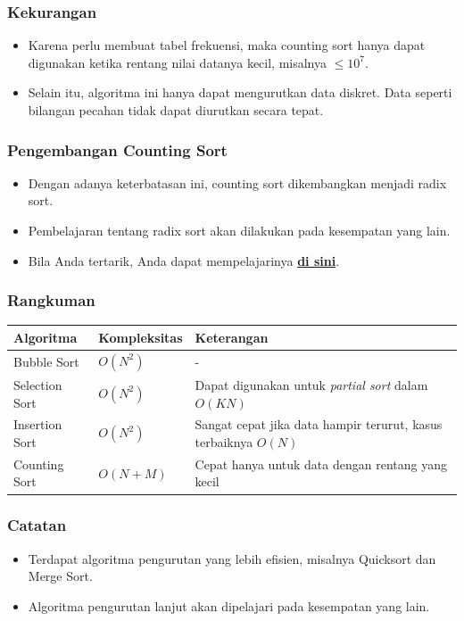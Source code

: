 \begin{frame}
\frametitle{Kekurangan}
  \begin{itemize}
    \item Karena perlu membuat tabel frekuensi, maka counting sort hanya dapat digunakan ketika rentang nilai datanya kecil, misalnya $\le 10^7$.
    \item Selain itu, algoritma ini hanya dapat mengurutkan data diskret. Data seperti bilangan pecahan tidak dapat diurutkan secara tepat.
  \end{itemize}
\end{frame}

\begin{frame}
\frametitle{Pengembangan Counting Sort}
  \begin{itemize}
    \item Dengan adanya keterbatasan ini, counting sort dikembangkan
    menjadi radix sort.
    \item Pembelajaran tentang radix sort akan dilakukan pada
    kesempatan yang lain.
    \item Bila Anda tertarik, Anda dapat mempelajarinya \href{https://en.wikipedia.org/wiki/Radix_sort}{\textbf{di sini}}.
  \end{itemize}
\end{frame}

\begin{frame}
\frametitle{Rangkuman}
  \begin{table}[ht]
    \begin{tabular}{|l|l|p{5 cm}|}
      \hline Algoritma  & Kompleksitas & Keterangan \\
      \hline Bubble Sort & $O(N^2)$ & - \\
      \hline Selection Sort & $O(N^2)$ & Dapat digunakan untuk \textit{partial sort} dalam $O(KN)$ \\
      \hline Insertion Sort & $O(N^2)$ & Sangat cepat jika data hampir terurut, kasus terbaiknya $O(N)$ \\
      \hline Counting Sort & $O(N+M)$ & Cepat hanya untuk data dengan rentang yang kecil \\
      \hline
    \end{tabular}
  \end{table}
\end{frame}

\begin{frame}
\frametitle{Catatan}
  \begin{itemize}
    \item Terdapat algoritma pengurutan yang lebih efisien, misalnya Quicksort dan Merge Sort.
    \item Algoritma pengurutan lanjut akan dipelajari pada kesempatan yang lain.
  \end{itemize}
\end{frame}


